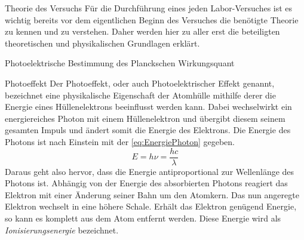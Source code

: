 \documentclass[pdftex, a4paper,11pt, twoside, ngerman]{report}
\begin{document}
  \begin{chapter}{Theorie des Versuchs}
    \label{chp:Theorie}
    Für die Durchführung eines jeden Labor-Versuches ist es wichtig bereits vor
    dem eigentlichen Beginn des Versuches die benötigte Theorie zu kennen und
    zu verstehen. Daher werden hier zu aller erst die beteiligten
    theoretischen und physikalischen Grundlagen erklärt.
   
   
   
    \begin{section}{Photoelektrische Bestimmung des Planckschen Wirkungsquant}
      \label{chp:TheoriePhotoelektrischesWirkungsquantum}
     
     
     
      
      \begin{subsection}{Photoeffekt}
        \label{chp:TheoriePhotoelektrischesWirkungsquantumPhotoeffekt}
        Der Photoeffekt, oder auch Photoelektrischer Effekt genannt, bezeichnet
        eine physikalische Eigenschaft der Atomhülle mithilfe derer die
        Energie eines Hüllenelektrons beeinflusst werden kann. Dabei
        wechselwirkt ein energiereiches Photon mit einem Hüllenelektron und
        übergibt diesem seinem gesamten Impuls und ändert somit die Energie
        des Elektrons. Die Energie des Photons ist nach Einstein mit der
        \cref{eq:EnergiePhoton} gegeben.
        \begin{equation}
          \label{eq:EnergiePhoton}
          E=h\nu=\frac{hc}{\lambda}
        \end{equation}
        Daraus geht also hervor, dass die Energie antiproportional zur
        Wellenlänge des Photons ist. Abhängig von der Energie des absorbierten
        Photons reagiert das Elektron mit einer Änderung seiner Bahn um den
        Atomkern. Das nun angeregte Elektron wechselt in eine höhere Schale.
        Erhält das Elektron genügend Energie, so kann es komplett aus dem Atom
        entfernt werden. Diese Energie wird als \textit{Ionisierungsenergie}
        bezeichnet.
       

\end{subsection}
\end{section}
\end{chapter}
\end{document}

